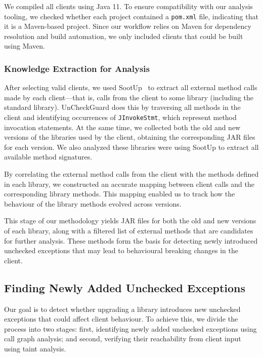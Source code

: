 We compiled all clients using Java 11. To ensure compatibility with our analysis tooling, we checked whether each project contained a \texttt{pom.xml} file, indicating that it is a Maven-based project. Since our workflow relies on Maven for dependency resolution and build automation, we only included clients that could be built using Maven.

\subsubsection{Knowledge Extraction for Analysis}

After selecting valid clients, we used SootUp~\cite{Karakaya24:_sootup} to extract all external method calls made by each client---that is, calls from the client to some library (including the standard library). UnCheckGuard does this by traversing all methods in the client and identifying occurrences of \texttt{JInvokeStmt}, which represent method invocation statements. At the same time, we collected both the old and new versions of the libraries used by the client, obtaining the corresponding JAR files for each version. We also analyzed these libraries were using SootUp to extract all available method signatures.

By correlating the external method calls from the client with the methods defined in each library, we constructed an accurate mapping between client calls and the corresponding library methods. This mapping enabled us to track how the behaviour of the library methods evolved across versions.

This stage of our methodology yields JAR files for both the old and new versions of each library, along with a filtered list of external methods that are candidates for further analysis. These methods form the basis for detecting newly introduced unchecked exceptions that may lead to behavioural breaking changes in the client.

\subsection{Finding Newly Added Unchecked Exceptions}

Our goal is to detect whether upgrading a library introduces new unchecked exceptions that could affect client behaviour. To achieve this, we divide the process into two stages: first, identifying newly added unchecked exceptions using call graph analysis; and second, verifying their reachability from client input using taint analysis.

